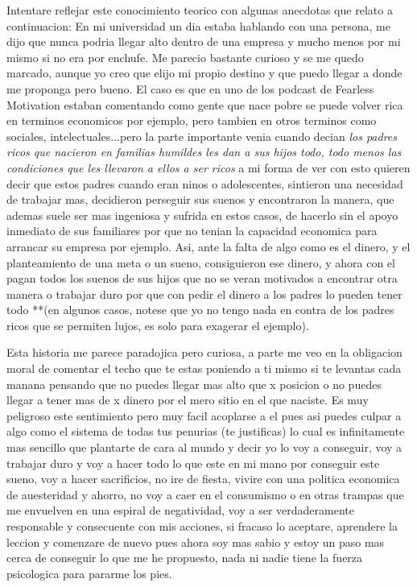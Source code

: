 Intentare reflejar este conocimiento teorico con algunas anecdotas que relato a continuacion: En mi universidad un dia estaba hablando con una persona, me dijo que nunca podria llegar alto dentro de una empresa y mucho menos por mi mismo si no era por enchufe. Me parecio bastante curioso y se me quedo marcado, aunque yo creo que elijo mi propio destino y que puedo llegar a donde me proponga pero bueno. El caso es que en uno de los podcast de Fearless Motivation estaban comentando como gente que nace pobre se puede volver rica en terminos economicos por ejemplo, pero tambien en otros terminos como sociales, intelectuales...pero la parte importante venia cuando decian \textit{los padres ricos que nacieron en familias humildes les dan a sus hijos todo, todo menos las condiciones que les llevaron a ellos a ser ricos} a mi forma de ver con esto quieren decir que estos padres cuando eran ninos o adolescentes, sintieron una necesidad de trabajar mas, decidieron perseguir sus suenos y encontraron la manera, que ademas suele ser mas ingeniosa y sufrida en estos casos, de hacerlo sin el apoyo inmediato de sus familiares por que no tenian la capacidad economica para arrancar su empresa por ejemplo. Asi, ante la falta de algo como es el dinero, y el planteamiento de una meta o un sueno, consiguieron ese dinero, y ahora con el pagan todos los suenos de sus hijos que no se veran motivados a encontrar otra manera o trabajar duro por que con pedir el dinero a los padres lo pueden tener todo **(en algunos casos, notese que yo no tengo nada en contra de los padres ricos que se permiten lujos, es solo para exagerar el ejemplo).

Esta historia me parece paradojica pero curiosa, a parte me veo en la obligacion moral de comentar el techo que te estas poniendo a ti mismo si te levantas cada manana pensando que no puedes llegar mas alto que x posicion o no puedes llegar a tener mas de x dinero por el mero sitio en el que naciste. Es muy peligroso este sentimiento pero muy facil acoplarse a el pues asi puedes culpar a algo como el sistema de todas tus penurias (te justificas) lo cual es infinitamente mas sencillo que plantarte de cara al mundo y decir yo lo voy a conseguir, voy a trabajar duro y voy a hacer todo lo que este en mi mano por conseguir este sueno, voy a hacer sacrificios, no ire de fiesta, vivire con una politica economica de auesteridad y ahorro, no voy a caer en el consumismo o en otras trampas que me envuelven en una espiral de negatividad, voy a ser verdaderamente responsable y consecuente con mis acciones, si fracaso lo aceptare, aprendere la leccion y comenzare de nuevo pues ahora soy mas sabio y estoy un paso mas cerca de conseguir lo que me he propuesto, nada ni nadie tiene la fuerza psicologica para pararme los pies.




